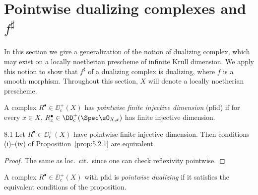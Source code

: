 \section{Pointwise dualizing complexes and $f^{\sharp}$}\label{sec:5.8}
\begingroup
\setlength{\emergencystretch}{2em}

In this section we give a generalization of the notion of dualizing complex, which may exist on a locally noetherian prescheme of infinite Krull dimension. We apply this notion to show that $f^{\sharp}$ of a dualizing complex is dualizing, where $f$ is a smooth morphism. Throughout this section, $X$ will denote a locally noetherian prescheme.

\begin{definition*}
A complex $R^\bullet\in\DD_{\mathrm{c}}^+(X)$ has \emph{pointwise finite injective dimension} (pfid) if for every $x\in X$, $R_x^\bullet\in\DD_{\mathrm{c}}^+(\Spec\sO_{X,x})$ has finite injective dimension.
\end{definition*}

\begin{bookproposition}{8.1}\label{prop:5.8.1}
Let $R^\bullet\in\DD_{\mathrm{c}}^+(X)$ have pointwise finite injective dimension. Then conditions (i)--(iv) of Proposition~\ref{prop:5.2.1} are equivalent.
\end{bookproposition}

\begin{proof}
The same as loc.\ cit.\ since one can check reflexivity pointwise.
\end{proof}

\begin{definition*}
A complex $R^\bullet\in\DD^+_{\mathrm{c}}(X)$ with pfid is \emph{pointwise dualizing} if it satisfies the equivalent conditions of the proposition.
\end{definition*}

